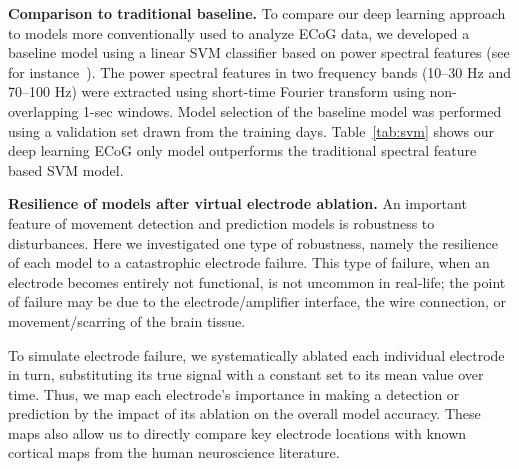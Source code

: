 \documentclass[letterpaper]{article} %
\begin{document}
\textbf{Comparison to traditional baseline.} To compare our deep learning approach to models more conventionally used to analyze ECoG data, we developed a baseline model using a linear SVM classifier based on power spectral features (see for instance~\cite{shenoy2008,Yanagisawa2011}).
The power spectral features in two frequency bands (10--30 Hz and 70--100 Hz) were extracted using short-time Fourier transform using non-overlapping 1-sec windows. 
Model selection of the baseline model was performed using a validation set drawn from the training days. 
Table~\ref{tab:svm} shows our deep learning ECoG only model outperforms the traditional spectral feature based SVM model. 


\textbf{Resilience of models after virtual electrode ablation.} An important feature of movement detection and prediction models is robustness to disturbances. Here we investigated one type of robustness, namely the resilience of each model to a catastrophic electrode failure. This type of failure, when an electrode becomes entirely not functional, is not uncommon in real-life; the point of failure may be due to the electrode/amplifier interface, the wire connection, or movement/scarring of the brain tissue.

To simulate electrode failure, we systematically ablated each individual electrode in turn, substituting its true signal with a constant set to its mean value over time. Thus, we map each electrode's importance in making a detection or prediction by the impact of its ablation on the overall model accuracy. These maps also allow us to directly compare key electrode locations with known cortical maps from the human neuroscience literature.

\begin{table}[h]
\centering
\caption{Conv + LSTM vs. LSTM only
\label{tab:lstm}
}
\end{table}
\end{document}
